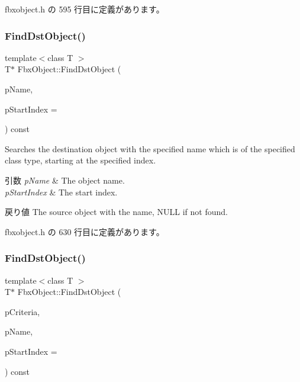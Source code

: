  fbxobject.\+h の 595 行目に定義があります。

\mbox{\label{class_fbx_object_a4a768949e619922b90d4a87ae3800cf5}} 
\subsubsection{\texorpdfstring{Find\+Dst\+Object()}{FindDstObject()}\hspace{0.1cm}{\footnotesize\ttfamily [3/4]}}
{\footnotesize\ttfamily template$<$class T $>$ \\
T$\ast$ Fbx\+Object\+::\+Find\+Dst\+Object (\begin{DoxyParamCaption}\item[{const char $\ast$}]{p\+Name,  }\item[{int}]{p\+Start\+Index = {} }\end{DoxyParamCaption}) const\hspace{0.3cm}{\ttfamily [inline]}}

Searches the destination object with the specified name which is of the specified class type, starting at the specified index. 
\begin{DoxyParams}{引数}
{\em p\+Name} & The object name. \\
\hline
{\em p\+Start\+Index} & The start index. \\
\hline
\end{DoxyParams}
\begin{DoxyReturn}{戻り値}
The source object with the name, N\+U\+LL if not found. 
\end{DoxyReturn}


 fbxobject.\+h の 630 行目に定義があります。

\mbox{\label{class_fbx_object_a3b306a938291cb57f964bdfebaf503e7}} 
\subsubsection{\texorpdfstring{Find\+Dst\+Object()}{FindDstObject()}\hspace{0.1cm}{\footnotesize\ttfamily [4/4]}}
{\footnotesize\ttfamily template$<$class T $>$ \\
T$\ast$ Fbx\+Object\+::\+Find\+Dst\+Object (\begin{DoxyParamCaption}\item[{const \hyperlink{class_fbx_criteria}{Fbx\+Criteria} \&}]{p\+Criteria,  }\item[{const char $\ast$}]{p\+Name,  }\item[{int}]{p\+Start\+Index = {} }\end{DoxyParamCaption}) const\hspace{0.3cm}{\ttfamily [inline]}}

